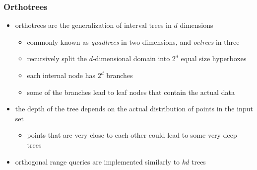 \begin{frame}[fragile]
%
  \frametitle{Orthotrees}
%
  \begin{itemize}
%
  \item orthotrees are the generalization of interval trees in $d$ dimensions
    \begin{itemize}
    \item commonly known as {\em quadtrees} in two dimensions, and {\em octrees} in three
    \item recursively split the $d$-dimensional domain into $2^{d}$ equal size hyperboxes
    \item each internal node has $2^{d}$ branches
    \item some of the branches lead to leaf nodes that contain the actual data
    \end{itemize}
%
  \item the depth of the tree depends on the actual distribution of points in the input set
    \begin{itemize}
    \item points that are very close to each other could lead to some very deep trees
    \end{itemize}
%
  \item orthogonal range queries are implemented similarly to $kd$ trees
%
  \end{itemize}
%
\end{frame}

